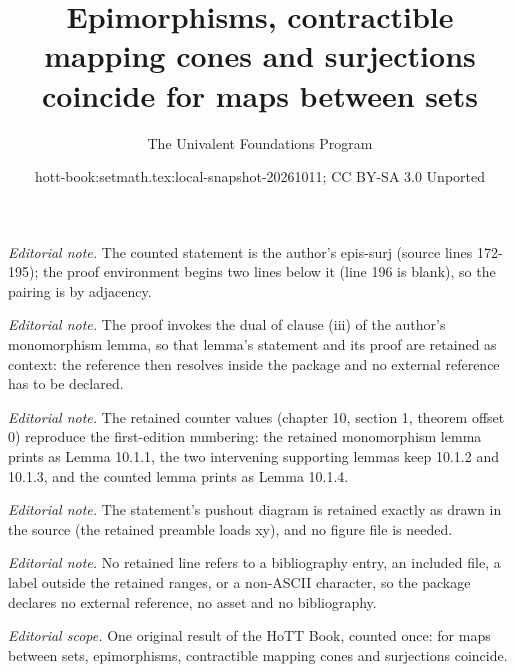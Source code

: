 \documentclass[10pt,a4paper]{article}
\title{Epimorphisms, contractible mapping cones and surjections coincide for maps between sets}
\author{The Univalent Foundations Program}
\date{hott-book:setmath.tex:local-snapshot-20261011; CC BY-SA 3.0 Unported}
\newcounter{chapter}
\theoremstyle{definition}
\theoremstyle{remark}
\numberwithin{equation}{section}
\begin{document}
\maketitle
\setcounter{chapter}{10}
\setcounter{section}{1}
\setcounter{thm}{0}
\noindent\textit{Editorial note.} The counted statement is the author's epis-surj (source lines 172-195); the proof environment begins two lines below it (line 196 is blank), so the pairing is by adjacency.\par\medskip
\noindent\textit{Editorial note.} The proof invokes the dual of clause (iii) of the author's monomorphism lemma, so that lemma's statement and its proof are retained as context: the reference then resolves inside the package and no external reference has to be declared.\par\medskip
\noindent\textit{Editorial note.} The retained counter values (chapter 10, section 1, theorem offset 0) reproduce the first-edition numbering: the retained monomorphism lemma prints as Lemma 10.1.1, the two intervening supporting lemmas keep 10.1.2 and 10.1.3, and the counted lemma prints as Lemma 10.1.4.\par\medskip
\noindent\textit{Editorial note.} The statement's pushout diagram is retained exactly as drawn in the source (the retained preamble loads xy), and no figure file is needed.\par\medskip
\noindent\textit{Editorial note.} No retained line refers to a bibliography entry, an included file, a label outside the retained ranges, or a non-ASCII character, so the package declares no external reference, no asset and no bibliography.\par\medskip
\noindent\textit{Editorial scope.} One original result of the HoTT Book, counted once: for maps between sets, epimorphisms, contractible mapping cones and surjections coincide.\par\medskip
\end{document}
